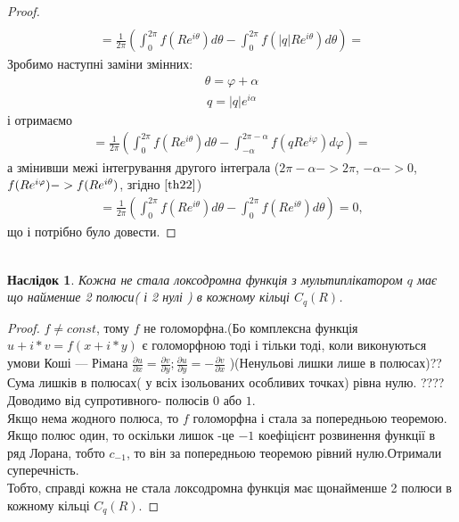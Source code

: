 \documentclass[12pt,a4paper]{article}
\begin{document}
\begin{proof}
\[\begin{array}{l}
\end{array} \] 
\[\begin{array}{l}
= \frac{1}{2\pi}(\int_{0}^{2\pi} f(Re^{i\theta})d\theta  - \int_{0}^{2\pi}f(\left |q \right |Re^{i\theta })d\theta) = 
\end{array} \]
Зробимо наступні заміни змінних:
\begin{equation}\label{th22}
\begin{array}{l}
\theta =\varphi +\alpha 
\end{array} 
\end{equation}
\begin{equation}\label{th23}
\begin{array}{l}
q=\left |q  \right |e^{i\alpha }
\end{array} 
\end{equation}
і отримаємо
\[\begin{array}{l}
= \frac{1}{2\pi}(\int_{0}^{2\pi} f(Re^{i\theta})d\theta  - \int_{-\alpha}^{2\pi-\alpha}f(qRe^{i\varphi })d\varphi)=
\end{array} \]
а змінивши межі інтегрування другого інтеграла ($2\pi-\alpha->2\pi$, $ -\alpha->0$, $ \\
f(Re^{i\varphi})->f(Re^{i\theta})$, згідно $\eqref {th22} $)
\[\begin{array}{l}
=\frac{1}{2\pi}(\int_{0}^{2\pi} f(Re^{i\theta})d\theta - \int_{0}^{2\pi}f(Re^{i\theta })d\theta)=0,
\end{array}\]
що і потрібно було довести.
\end{proof}
\[\begin{array}{l}
\end{array} \]

\newtheorem{nasl}{Наслідок}
\begin{nasl}
 Кожна не стала локсодромна функція з мультиплікатором $q$ має що найменше 2 полюси( і 2 нулі ) в кожному кільці $C_{q}(R)$.
\end{nasl}
\begin{proof}
$f \neq const $, тому $f$ не голоморфна.(Бо  комплексна функція $u+i*v=f(x+i*y)$ є голоморфною тоді і тільки тоді, коли виконуються умови Коші — Рімана
$\frac{\partial u}{\partial x}=\frac{\partial v}{\partial y};
\frac{\partial u}{\partial y}=-\frac{\partial v}{\partial x}$ )(Ненульові лишки лише в полюсах)??    Сума лишків в полюсах( у всіх ізольованих особливих точках) рівна нулю. ???? Доводимо від супротивного- полюсів $0$ або $1$.\\
Якщо нема жодного полюса, то $f$ голоморфна і стала за попередньою теоремою. \\
Якщо полюс один, то оскільки лишок -це $-1$ коефіцієнт розвинення функції в ряд Лорана, тобто $c_{-1}$, то він за попередньою теоремою рівний нулю.Отримали суперечність.\\
Тобто, справді кожна не стала локсодромна функція має щонайменше 2 полюси в кожному кільці $C_{q}(R)$.
\end{proof}
\[\begin{array}{l}
\end{array} \]
\end{document}
